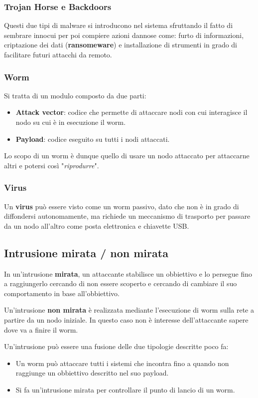 \subsubsection{Trojan Horse e Backdoors}
Questi due tipi di malware si introducono nel sistema sfruttando il fatto di sembrare innocui per poi compiere azioni
dannose come: furto di informazioni, criptazione dei dati (\textbf{ransomeware}) e installazione di strumenti in grado
di facilitare futuri attacchi da remoto.

\subsubsection{Worm}
Si tratta di un modulo composto da due parti:
\begin{itemize}
	\item \textbf{Attack vector}: codice che permette di attaccare nodi con cui interagisce il nodo su cui è in
	      esecuzione il worm.
	\item \textbf{Payload}: codice eseguito su tutti i nodi attaccati.
\end{itemize}
Lo scopo di un worm è dunque quello di usare un nodo attaccato per attaccarne altri e potersi così "\emph{riprodurre}".

\subsubsection{Virus}
Un \textbf{virus} può essere visto come un worm passivo, dato che non è in grado di diffondersi autonomamente, ma
richiede un meccanismo di trasporto per passare da un nodo all'altro come posta elettronica e chiavette USB.

\subsection{Intrusione mirata / non mirata}
In un'intrusione \textbf{mirata}, un attaccante stabilisce un obbiettivo e lo persegue fino a raggiungerlo cercando
di non essere scoperto e cercando di cambiare il suo comportamento in base all'obbiettivo.

Un'intrusione \textbf{non mirata} è realizzata mediante l'esecuzione di worm sulla rete a partire da un nodo iniziale.
In questo caso non è interesse dell'attaccante sapere dove va a finire il worm.

Un'intrusione può essere una fusione delle due tipologie descritte poco fa:
\begin{itemize}
	\item Un worm può attaccare tutti i sistemi che incontra fino a quando non raggiunge un obbiettivo descritto nel
	      suo payload.
	\item Si fa un'intrusione mirata per controllare il punto di lancio di un worm.
\end{itemize}


